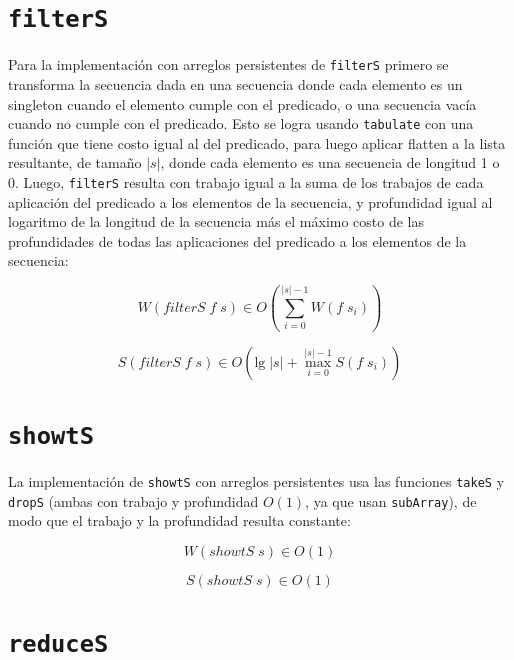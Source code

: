 \documentclass[a4paper,10pt]{article}
\begin{document}
\section*{\texttt{filterS}}

Para la implementación con arreglos persistentes de \texttt{filterS} primero se
transforma la secuencia dada en una secuencia donde cada elemento es un singleton
cuando el elemento cumple con el predicado, o una secuencia vacía cuando no cumple
con el predicado. Esto se logra usando \texttt{tabulate} con una función que tiene
costo igual al del predicado, para luego aplicar flatten a la lista resultante,
de tamaño $\vert s \vert$, donde cada elemento es una secuencia de longitud 1 o 0.
Luego, \texttt{filterS} resulta con trabajo igual a la suma de los trabajos de
cada aplicación del predicado a los elementos de la secuencia, y profundidad igual
al logaritmo de la longitud de la secuencia más el máximo costo de las profundidades
de todas las aplicaciones del predicado a los elementos de la secuencia:

\begin{equation*}
    W \left( filterS \; f \; s \right) \in
    O \left( \sum_{i=0}^{\vert s \vert -1} W(f \; s_i) \right)
\end{equation*}

\begin{equation*}
    S \left( filterS \; f \; s \right) \in
    O \left( \text{lg} \; \vert s \vert + \max_{i=0}^{\vert s \vert -1} S(f \; s_i) \right)
\end{equation*}


\section*{\texttt{showtS}}

La implementación de \texttt{showtS} con arreglos persistentes usa las funciones
\texttt{takeS} y \texttt{dropS} (ambas con trabajo y profundidad $O \left( 1 \right)$,
ya que usan \texttt{subArray}), de modo que el trabajo y la profundidad resulta
constante:

\begin{equation*}
    W \left( showtS \; s \right) \in
    O \left( 1 \right)
\end{equation*}

\begin{equation*}
    S \left( showtS \; s \right) \in
    O \left( 1 \right)
\end{equation*}


\section*{\texttt{reduceS}}
\end{document}
